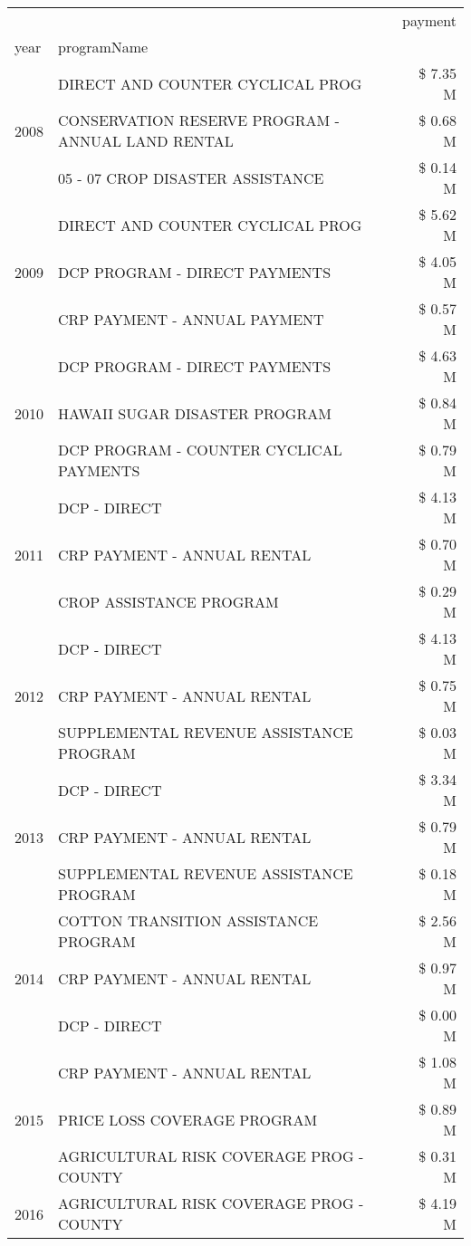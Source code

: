 \begin{tabular}{llr}
\toprule
 &  & payment \\
year & programName &  \\
\midrule
\multirow[t]{3}{*}{2008} & DIRECT AND COUNTER CYCLICAL PROG & \$ 7.35 M \\
 & CONSERVATION RESERVE PROGRAM - ANNUAL LAND RENTAL & \$ 0.68 M \\
 & 05 - 07 CROP DISASTER ASSISTANCE & \$ 0.14 M \\
\cline{1-3}
\multirow[t]{3}{*}{2009} & DIRECT AND COUNTER CYCLICAL PROG & \$ 5.62 M \\
 & DCP PROGRAM - DIRECT PAYMENTS & \$ 4.05 M \\
 & CRP PAYMENT - ANNUAL PAYMENT & \$ 0.57 M \\
\cline{1-3}
\multirow[t]{3}{*}{2010} & DCP PROGRAM - DIRECT PAYMENTS & \$ 4.63 M \\
 & HAWAII SUGAR DISASTER PROGRAM & \$ 0.84 M \\
 & DCP PROGRAM - COUNTER CYCLICAL PAYMENTS & \$ 0.79 M \\
\cline{1-3}
\multirow[t]{3}{*}{2011} & DCP - DIRECT & \$ 4.13 M \\
 & CRP PAYMENT - ANNUAL RENTAL & \$ 0.70 M \\
 & CROP ASSISTANCE PROGRAM & \$ 0.29 M \\
\cline{1-3}
\multirow[t]{3}{*}{2012} & DCP - DIRECT & \$ 4.13 M \\
 & CRP PAYMENT - ANNUAL RENTAL & \$ 0.75 M \\
 & SUPPLEMENTAL REVENUE ASSISTANCE PROGRAM & \$ 0.03 M \\
\cline{1-3}
\multirow[t]{3}{*}{2013} & DCP - DIRECT & \$ 3.34 M \\
 & CRP PAYMENT - ANNUAL RENTAL & \$ 0.79 M \\
 & SUPPLEMENTAL REVENUE ASSISTANCE PROGRAM & \$ 0.18 M \\
\cline{1-3}
\multirow[t]{3}{*}{2014} & COTTON TRANSITION ASSISTANCE PROGRAM & \$ 2.56 M \\
 & CRP PAYMENT - ANNUAL RENTAL & \$ 0.97 M \\
 & DCP - DIRECT & \$ 0.00 M \\
\cline{1-3}
\multirow[t]{3}{*}{2015} & CRP PAYMENT - ANNUAL RENTAL & \$ 1.08 M \\
 & PRICE LOSS COVERAGE PROGRAM & \$ 0.89 M \\
 & AGRICULTURAL RISK COVERAGE PROG - COUNTY & \$ 0.31 M \\
\cline{1-3}
\multirow[t]{3}{*}{2016} & AGRICULTURAL RISK COVERAGE PROG - COUNTY & \$ 4.19 M \\

\end{tabular}
